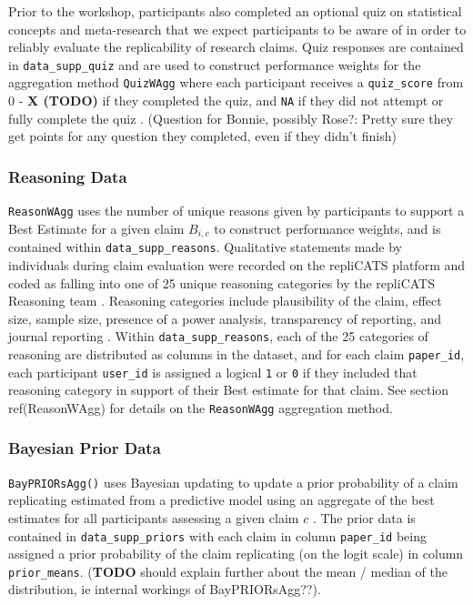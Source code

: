 \documentclass[article]{jss}
\begin{document}
Prior to the workshop, participants also completed an optional quiz on
statistical concepts and meta-research that we expect participants to be
aware of in order to reliably evaluate the replicability of research
claims. Quiz responses are contained in \texttt{data\_supp\_quiz} and
are used to construct performance weights for the aggregation method
\texttt{QuizWAgg} where each participant receives a \texttt{quiz\_score}
from 0 - \textbf{X (TODO)} if they completed the quiz, and \texttt{NA}
if they did not attempt or fully complete the quiz \citep[see][ for
further details]{Hanea2021}. (Question for Bonnie, possibly Rose?:
Pretty sure they get points for any question they completed, even if
they didn't finish)

\hypertarget{sec-reasonwagg-supplementary-data}{%
\subsubsection{Reasoning Data}\label{sec-reasonwagg-supplementary-data}}

\texttt{ReasonWAgg} uses the number of unique reasons given by
participants to support a Best Estimate for a given claim \(B_{i,c}\) to
construct performance weights, and is contained within
\texttt{data\_supp\_reasons}. Qualitative statements made by individuals
during claim evaluation were recorded on the repliCATS platform
\citep{Pearson2021} and coded as falling into one of 25 unique reasoning
categories by the repliCATS Reasoning team \citep{Wintle:2021}.
Reasoning categories include plausibility of the claim, effect size,
sample size, presence of a power analysis, transparency of reporting,
and journal reporting \citep{Hanea2021}. Within
\texttt{data\_supp\_reasons}, each of the 25 categories of reasoning are
distributed as columns in the dataset, and for each claim
\texttt{paper\_id}, each participant \texttt{user\_id} is assigned a
logical \texttt{1} or \texttt{0} if they included that reasoning
category in support of their Best estimate for that claim. See section
ref(ReasonWAgg) for details on the \texttt{ReasonWAgg} aggregation
method.

\hypertarget{sec-bayesian-supplementary-data}{%
\subsubsection{Bayesian Prior
Data}\label{sec-bayesian-supplementary-data}}

\texttt{BayPRIORsAgg()} uses Bayesian updating to update a prior
probability of a claim replicating estimated from a predictive model
\citep{Gould2021a} using an aggregate of the best estimates for all
participants assessing a given claim \(c\) \citep{Hanea2021}. The prior
data is contained in \texttt{data\_supp\_priors} with each claim in
column \texttt{paper\_id} being assigned a prior probability of the
claim replicating (on the logit scale) in column \texttt{prior\_means}.
(\textbf{TODO} should explain further about the mean / median of the
distribution, ie internal workings of BayPRIORsAgg??).
\end{document}
